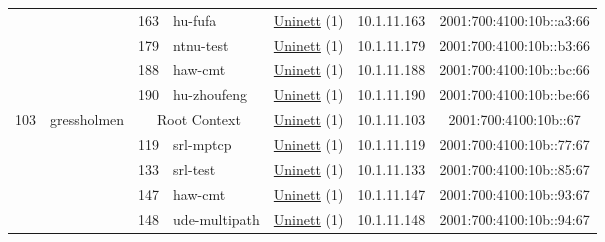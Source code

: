 \begin{small}
\begin{center}
\begin{longtable}{|c|c|c|c|c|c|c|c|}
  &  & \tiny{163} & \multicolumn{1}{|l|}{\tiny{hu-fufa}} & \multicolumn{2}{|c|}{\tiny{\href{https://www.uninett.no}{Uninett} (1)}} & \tiny{10.1.11.163} & \tiny{2001:700:4100:10b::a3:66} \\* \cline{3-3}\cline{4-4}\cline{5-5}\cline{6-6}\cline{7-7}\cline{8-8}
  &  & \tiny{179} & \multicolumn{1}{|l|}{\tiny{ntnu-test}} & \multicolumn{2}{|c|}{\tiny{\href{https://www.uninett.no}{Uninett} (1)}} & \tiny{10.1.11.179} & \tiny{2001:700:4100:10b::b3:66} \\* \cline{3-3}\cline{4-4}\cline{5-5}\cline{6-6}\cline{7-7}\cline{8-8}
  &  & \tiny{188} & \multicolumn{1}{|l|}{\tiny{haw-cmt}} & \multicolumn{2}{|c|}{\tiny{\href{https://www.uninett.no}{Uninett} (1)}} & \tiny{10.1.11.188} & \tiny{2001:700:4100:10b::bc:66} \\* \cline{3-3}\cline{4-4}\cline{5-5}\cline{6-6}\cline{7-7}\cline{8-8}
  &  & \tiny{190} & \multicolumn{1}{|l|}{\tiny{hu-zhoufeng}} & \multicolumn{2}{|c|}{\tiny{\href{https://www.uninett.no}{Uninett} (1)}} & \tiny{10.1.11.190} & \tiny{2001:700:4100:10b::be:66} \\ \hline
 \multirow{8}{*}{\tiny{103}} & \multicolumn{1}{|l|}{\multirow{8}{*}{\tiny{gressholmen}}} & \multicolumn{2}{|c|}{\tiny{Root Context}} & \multicolumn{2}{|c|}{\tiny{\href{https://www.uninett.no}{Uninett} (1)}} & \tiny{10.1.11.103} & \tiny{2001:700:4100:10b::67} \\* \cline{3-3}\cline{4-4}\cline{5-5}\cline{6-6}\cline{7-7}\cline{8-8}
  &  & \tiny{119} & \multicolumn{1}{|l|}{\tiny{srl-mptcp}} & \multicolumn{2}{|c|}{\tiny{\href{https://www.uninett.no}{Uninett} (1)}} & \tiny{10.1.11.119} & \tiny{2001:700:4100:10b::77:67} \\* \cline{3-3}\cline{4-4}\cline{5-5}\cline{6-6}\cline{7-7}\cline{8-8}
  &  & \tiny{133} & \multicolumn{1}{|l|}{\tiny{srl-test}} & \multicolumn{2}{|c|}{\tiny{\href{https://www.uninett.no}{Uninett} (1)}} & \tiny{10.1.11.133} & \tiny{2001:700:4100:10b::85:67} \\* \cline{3-3}\cline{4-4}\cline{5-5}\cline{6-6}\cline{7-7}\cline{8-8}
  &  & \tiny{147} & \multicolumn{1}{|l|}{\tiny{haw-cmt}} & \multicolumn{2}{|c|}{\tiny{\href{https://www.uninett.no}{Uninett} (1)}} & \tiny{10.1.11.147} & \tiny{2001:700:4100:10b::93:67} \\* \cline{3-3}\cline{4-4}\cline{5-5}\cline{6-6}\cline{7-7}\cline{8-8}
  &  & \tiny{148} & \multicolumn{1}{|l|}{\tiny{ude-multipath}} & \multicolumn{2}{|c|}{\tiny{\href{https://www.uninett.no}{Uninett} (1)}} & \tiny{10.1.11.148} & \tiny{2001:700:4100:10b::94:67} \\* \cline{3-3}\cline{4-4}\cline{5-5}\cline{6-6}\cline{7-7}\cline{8-8}

\end{longtable}
\end{center}
\end{small}
